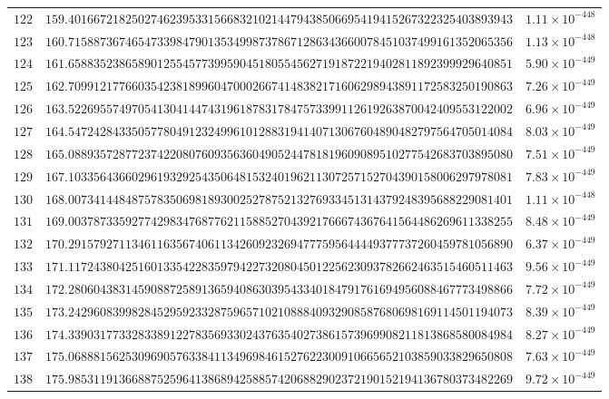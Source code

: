 \documentclass[12pt,reqno]{amsart}
\theoremstyle{remark}
\begin{document}
\begin{longtable}{clc}
$122$ & $159.4016672182502746239533156683210214479438506695419415267322325403893943$ & $1.11\times 10^{-448}$ \\
$123$ & $160.7158873674654733984790135349987378671286343660078451037499161352065356$ & $1.13\times 10^{-448}$ \\
$124$ & $161.6588352386589012554577399590451805545627191872219402811892399929640851$ & $5.90\times 10^{-449}$ \\
$125$ & $162.7099121776603542381899604700026674148382171606298943891172583250190863$ & $7.26\times 10^{-449}$ \\
$126$ & $163.5226955749705413041447431961878317847573399112619263870042409553122002$ & $6.96\times 10^{-449}$ \\
$127$ & $164.5472428433505778049123249961012883194140713067604890482797564705014084$ & $8.03\times 10^{-449}$ \\
$128$ & $165.0889357287723742208076093563604905244781819609089510277542683703895080$ & $7.51\times 10^{-449}$ \\
$129$ & $167.1033564366029619329254350648153240196211307257152704390158006297978081$ & $7.83\times 10^{-449}$ \\
$130$ & $168.0073414484875783506981893002527875213276933451314379248395688229081401$ & $1.11\times 10^{-448}$ \\
$131$ & $169.0037873359277429834768776211588527043921766674367641564486269611338255$ & $8.48\times 10^{-449}$ \\
$132$ & $170.2915792711346116356740611342609232694777595644449377737260459781056890$ & $6.37\times 10^{-449}$ \\
$133$ & $171.1172438042516013354228359794227320804501225623093782662463515460511463$ & $9.56\times 10^{-449}$ \\
$134$ & $172.2806043831459088725891365940863039543340184791761694956088467773498866$ & $7.72\times 10^{-449}$ \\
$135$ & $173.2429608399828452959233287596571021088840932908587680698169114501194073$ & $8.39\times 10^{-449}$ \\
$136$ & $174.3390317733283389122783569330243763540273861573969908211813868580084984$ & $8.27\times 10^{-449}$ \\
$137$ & $175.0688815625309690576338411349698461527622300910665652103859033829650808$ & $7.63\times 10^{-449}$ \\
$138$ & $175.9853119136688752596413868942588574206882902372190152194136780373482269$ & $9.72\times 10^{-449}$ \\

\end{longtable}
\end{document}
